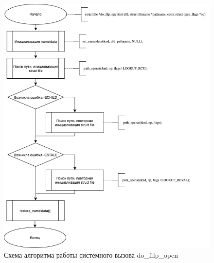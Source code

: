 \documentclass[12pt]{report}
\begin{document}
\begin{figure}[h!]
            \centering
            \includegraphics[scale=0.7]{do_filp_open.png}
            \caption{Схема алгоритма работы системного вызова do\_filp\_open}
            \label{png:testing:result}
\end{figure}
\end{document}
